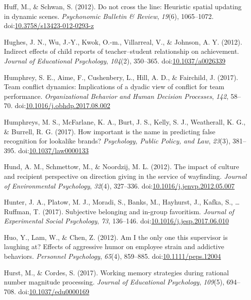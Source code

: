 \documentclass[english,man]{apa6}
\theoremstyle{definition}
\theoremstyle{definition}
\theoremstyle{definition}
\theoremstyle{remark}
\begin{document}
\hypertarget{ref-Huff2012a}{}
Huff, M., \& Schwan, S. (2012). Do not cross the line: Heuristic spatial
updating in dynamic scenes. \emph{Psychonomic Bulletin \& Review},
\emph{19}(6), 1065--1072.
doi:\href{https://doi.org/10.3758/s13423-012-0293-z}{10.3758/s13423-012-0293-z}

\hypertarget{ref-Hughes2012}{}
Hughes, J. N., Wu, J.-Y., Kwok, O.-m., Villarreal, V., \& Johnson, A. Y.
(2012). Indirect effects of child reports of teacher--student
relationship on achievement. \emph{Journal of Educational Psychology},
\emph{104}(2), 350--365.
doi:\href{https://doi.org/10.1037/a0026339}{10.1037/a0026339}

\hypertarget{ref-Humphrey2017}{}
Humphrey, S. E., Aime, F., Cushenbery, L., Hill, A. D., \& Fairchild, J.
(2017). Team conflict dynamics: Implications of a dyadic view of
conflict for team performance. \emph{Organizational Behavior and Human
Decision Processes}, \emph{142}, 58--70.
doi:\href{https://doi.org/10.1016/j.obhdp.2017.08.002}{10.1016/j.obhdp.2017.08.002}

\hypertarget{ref-Humphreys2017}{}
Humphreys, M. S., McFarlane, K. A., Burt, J. S., Kelly, S. J.,
Weatherall, K. G., \& Burrell, R. G. (2017). How important is the name
in predicting false recognition for lookalike brands? \emph{Psychology,
Public Policy, and Law}, \emph{23}(3), 381--395.
doi:\href{https://doi.org/10.1037/law0000133}{10.1037/law0000133}

\hypertarget{ref-Hund2012}{}
Hund, A. M., Schmettow, M., \& Noordzij, M. L. (2012). The impact of
culture and recipient perspective on direction giving in the service of
wayfinding. \emph{Journal of Environmental Psychology}, \emph{32}(4),
327--336.
doi:\href{https://doi.org/10.1016/j.jenvp.2012.05.007}{10.1016/j.jenvp.2012.05.007}

\hypertarget{ref-Hunter2017}{}
Hunter, J. A., Platow, M. J., Moradi, S., Banks, M., Hayhurst, J.,
Kafka, S., \ldots{} Ruffman, T. (2017). Subjective belonging and
in-group favoritism. \emph{Journal of Experimental Social Psychology},
\emph{73}, 136--146.
doi:\href{https://doi.org/10.1016/j.jesp.2017.06.010}{10.1016/j.jesp.2017.06.010}

\hypertarget{ref-Huo2012}{}
Huo, Y., Lam, W., \& Chen, Z. (2012). Am I the only one this supervisor
is laughing at? Effects of aggressive humor on employee strain and
addictive behaviors. \emph{Personnel Psychology}, \emph{65}(4),
859--885.
doi:\href{https://doi.org/10.1111/peps.12004}{10.1111/peps.12004}

\hypertarget{ref-Hurst2017}{}
Hurst, M., \& Cordes, S. (2017). Working memory strategies during
rational number magnitude processing. \emph{Journal of Educational
Psychology}, \emph{109}(5), 694--708.
doi:\href{https://doi.org/10.1037/edu0000169}{10.1037/edu0000169}
\end{document}
